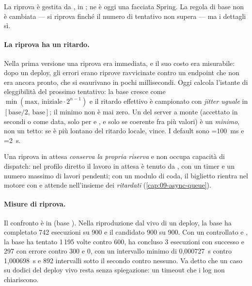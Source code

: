 La riprova \`e gestita da , in ;
 ne \`e oggi una facciata Spring. La regola di
base non \`e cambiata --- si riprova finch\'e il numero di tentativo non supera
 --- ma i dettagli s\`i.

\paragraph{La riprova ha un ritardo.} Nella prima versione una riprova era
immediata, e il suo costo era misurabile: dopo un deploy, gli errori
 erano riprove ravvicinate contro un endpoint che non era ancora
pronto, che si esaurivano in pochi millisecondi. Oggi  calcola
l'istante di eleggibilit\`a del prossimo tentativo: la base cresce come
$\min(\text{max},\,\text{iniziale}\cdot 2^{n-1})$ e il ritardo effettivo \`e
campionato con \emph{jitter uguale} in $[\text{base}/2,\,\text{base}]$; il minimo
non \`e mai zero. Un  del server a monte (accettato in secondi o
come data, solo per  e , e solo se coerente fra pi\`u valori) \`e un
\emph{minimo}, non un tetto: se \`e pi\`u lontano del ritardo locale, vince.
I default sono =100~ms e
=2~s.

Una riprova in attesa \emph{conserva la propria riserva} e non occupa capacit\`a di
dispatch: nel profilo diretto il lavoro in attesa \`e tenuto da
, con un timer e un numero massimo di lavori
pendenti; con un modulo di coda, il biglietto rientra nel motore con 
e attende nell'insieme dei \emph{ritardati} (\cref{cap:09-async-queue}).

\paragraph{Misure di riprova.} Il confronto \`e in
 (base ). Nella
riproduzione dal vivo di un deploy, la base ha completato 742 esecuzioni su 900 e il
candidato 900 su 900. Con un  controllato e , la base
ha tentato 1\,195 volte contro 600, ha concluso 3 esecuzioni con successo e 297 con
errore contro 300 e 0, con un intervallo minimo di 0,000727~s contro 1,000698~s e 892
intervalli sotto il secondo contro nessuno. Va detto che un caso su dodici del
deploy vivo resta senza spiegazione: un timeout che i log non chiariscono.

